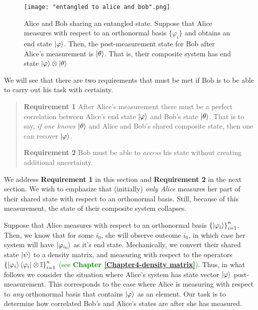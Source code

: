 \begin{figure}[h]
    \centering
    \texttt{[image: "entangled to alice and bob".png]}
    \caption{Alice and Bob sharing an entangled state. Suppose that Alice measures with respect to an orthonormal basis $\{\varphi_i\}$ and obtains an end state $\ket{\varphi}$.  Then, the post-measurement state for Bob after Alice's measurement is $\ket{\theta}$. That is, their composite system has end state $\ket{\varphi}\otimes\ket{\theta}$}
    \label{fig:entanglement}
\end{figure}


We will see that there are two requirements that must be met if Bob is to be able to carry out his task with certainty.

\begin{quote} 
    {\bf{Requirement 1}} After Alice's measurement there must be a perfect correlation between Alice's end state $\ket{\varphi}$ and Bob's state $\ket{\theta}$.  That is to say, {\emph{if one knows}} $\ket{\theta}$ and Alice and Bob's shared composite state, then one can recover $\ket{\varphi}$.
    \medskip
    
    {\bf{Requirement 2}} Bob must be able to {\emph{access}} his state without creating additional uncertainty.
   
\end{quote}


We address {\bf{Requirement 1}} in this section and {\bf{Requirement 2}} in the next section.  We wish to emphasize that (initially) {\emph{only Alice}} measures her part of their shared state with respect to an orthonormal basis.  Still, because of this measurement, the state of their composite system collapses.  

Suppose that Alice measures with respect to an orthonormal basis ${\{\ket{\varphi_i}\}}_{i=1}^{n}$.  Then, we know that for some $i_0$, she will observe outcome $i_0$, in which case her system will have $\ket{\varphi_{i_0}}$ as it's end state. Mechanically, we 
convert their shared state $\ket{\psi}$ to a density matrix, and measuring with respect to the operators ${\{\ket{\varphi_i}\bra{\varphi_i}\otimes \mathbb{I} \}}_{i=1}^n$ \textcolor{green}{(see \textbf{Chapter \ref{Chapter4-density matrix}})}.  Thus, in what follows we consider the situation where Alice's system has state vector $\ket{\varphi}$ post-measurement.  This corresponds to the case where Alice is measuring with respect to {\emph{any}} orthonormal basis that contains $\ket{\varphi}$ as an element. Our task is to determine how correlated Bob's and Alice's states are after she has measured.  

